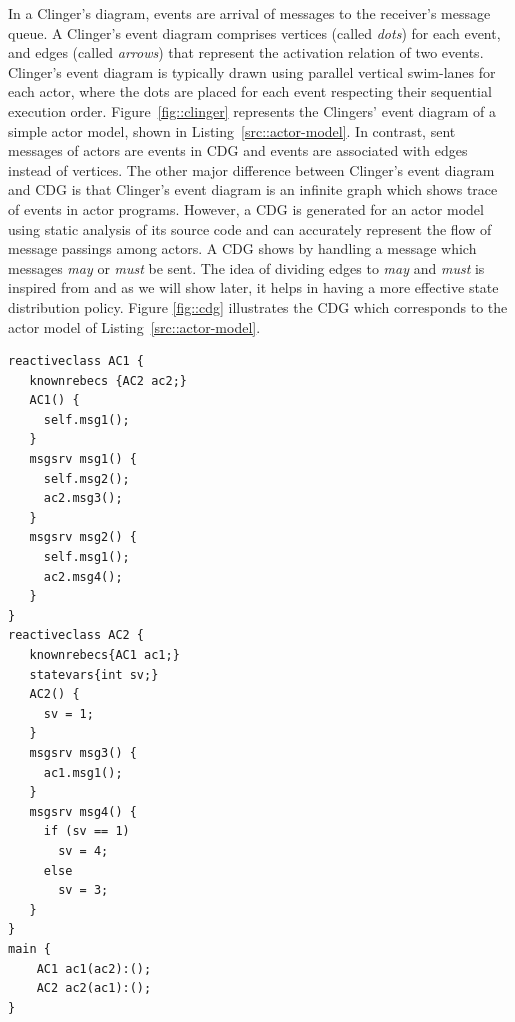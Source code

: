 In a Clinger's diagram, events are arrival of messages to the receiver's message queue. A Clinger's event diagram comprises vertices (called \emph{dots}) for each event, and edges (called \emph{arrows}) that represent the activation relation of two events. Clinger's event diagram is typically drawn using parallel vertical swim-lanes for each actor, where the dots are placed for each event respecting their sequential execution order. Figure~\ref{fig::clinger} represents the Clingers' event diagram of a simple actor model, shown in Listing~\ref{src::actor-model}. In contrast, sent messages of actors are events in CDG and events are associated with edges instead of vertices. The other major difference between Clinger's event diagram and CDG is that Clinger's event diagram is an infinite graph which shows trace of events in actor programs. However, a CDG is generated for an actor model using static analysis of its source code and can accurately represent the flow of message passings among actors. A CDG shows by handling a message which messages \emph{may} or \emph{must} be sent. The idea of dividing edges to \emph{may} and \emph{must} is inspired from \cite{DBLP:conf/lics/LarsenT88} and as we will show later, it helps in having a more effective state distribution policy. Figure \ref{fig::cdg} illustrates the CDG which corresponds to the actor model of Listing~\ref{src::actor-model}.

\begin{lstlisting}[language=rebeca, caption= A simple actor model (from \cite{DBLP:journals/eceasst/KhamespanahSMSR15}), label=src::actor-model]
reactiveclass AC1 {
   knownrebecs {AC2 ac2;}
   AC1() {
     self.msg1();
   }
   msgsrv msg1() {
     self.msg2();
     ac2.msg3();
   }
   msgsrv msg2() {
     self.msg1();
     ac2.msg4();
   }
}
reactiveclass AC2 {
   knownrebecs{AC1 ac1;}
   statevars{int sv;}
   AC2() {
     sv = 1;
   }
   msgsrv msg3() {
     ac1.msg1();
   }
   msgsrv msg4() {
     if (sv == 1)
       sv = 4;
     else
       sv = 3;
   }
}
main {
    AC1 ac1(ac2):();
    AC2 ac2(ac1):();
}
\end{lstlisting}

